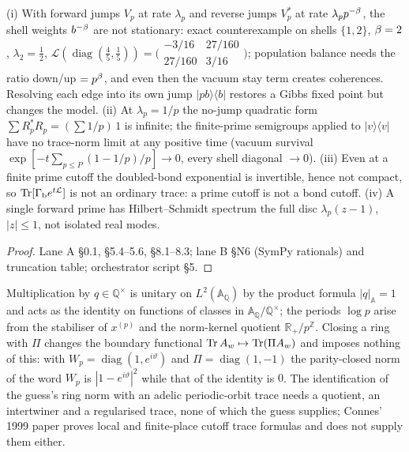 \begin{proposition}
\label{prop:phase-no-gibbs-no-trace}
(i) With forward jumps $V_p$ at rate $\lambda_p$ and reverse jumps $V_p^*$ at rate $\lambda_pp^{-\beta}$,
the shell weights $b^{-\beta}$ are not stationary: exact counterexample on shells $\{1,2\}$,
$\beta = 2$, $\lambda_2 = \tfrac12$, $\mathcal L(\operatorname{diag}(\tfrac45,\tfrac15)) =
\bigl(\begin{smallmatrix}-3/16&27/160\\27/160&3/16\end{smallmatrix}\bigr)$; population balance needs the
ratio down/up $= p^{\beta}$, and even then the vacuum stay term creates coherences. Resolving each
edge into its own jump $|pb\rangle\langle b|$ restores a Gibbs fixed point but changes the model.
(ii) At $\lambda_p = 1/p$ the no-jump quadratic form $\sum R_p^*R_p = (\sum1/p)\,1$ is infinite; the
finite-prime semigroups applied to $|v\rangle\langle v|$ have no trace-norm limit at any positive time
(vacuum survival $\exp[-t\sum_{p\le P}(1-1/p)/p]\to0$, every shell diagonal $\to0$). (iii) Even at a finite
prime cutoff the doubled-bond exponential is invertible, hence not compact, so $\operatorname{Tr}[\Gamma_{\mathrm b} e^{t\mathcal L}]$
is not an ordinary trace: a prime cutoff is not a bond cutoff. (iv) A single forward prime has
Hilbert--Schmidt spectrum the full disc $\lambda_p(z-1)$, $|z|\le1$, not isolated real modes.
\end{proposition}

\begin{proof}
Lane A \S0.1, \S5.4--5.6, \S8.1--8.3; lane B \S N6 (SymPy rationals) and truncation table;
orchestrator script \S5.
\end{proof}

\begin{proposition}
\label{prop:parity-closure-not-quotient}
Multiplication by $q\in\mathbb Q^\times$ is unitary on $L^2(\mathbb A_{\mathbb Q})$ by the product formula $|q|_{\mathbb A} = 1$
and acts as the identity on functions of classes in $\mathbb A_{\mathbb Q}/\mathbb Q^\times$; the periods
$\log p$ arise from the stabiliser of $x^{(p)}$ and the norm-kernel quotient $\mathbb R_+/p^{\mathbb Z}$.
Closing a ring with $\Pi$ changes the boundary functional $\operatorname{Tr} A_w\mapsto\operatorname{Tr}(\Pi A_w)$ and imposes nothing
of this: with $W_p = \operatorname{diag}(1,e^{i\vartheta})$ and $\Pi = \operatorname{diag}(1,-1)$ the parity-closed
norm of the word $W_p$ is $|1-e^{i\vartheta}|^2$ while that of the identity is $0$. The identification of
the guess's ring norm with an adelic periodic-orbit trace needs a quotient, an intertwiner and a
regularised trace, none of which the guess supplies; Connes' 1999 paper proves local and finite-place
cutoff trace formulas and does not supply them either.
\end{proposition}

